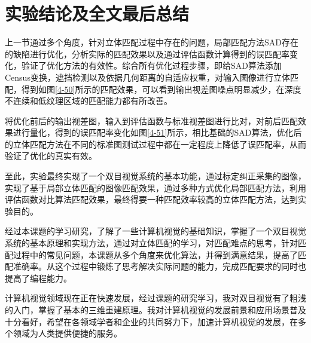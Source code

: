 \section{实验结论及全文最后总结}

上一节通过多个角度，针对立体匹配过程中存在的问题，局部匹配方法SAD存在的缺陷进行优化，分析实际的匹配效果以及通过评估函数计算得到的误匹配率变化，验证了优化方法的有效性。综合所有优化过程步骤，即给SAD算法添加Census变换，遮挡检测以及依据几何距离的自适应权重，对输入图像进行立体匹配，得到如图\ref{4-50}所示的匹配效果，可以看到输出视差图噪点明显减少，在深度不连续和低纹理区域的匹配能力都有所改善。


将优化前后的输出视差图，输入到评估函数与标准视差图进行比对，对前后匹配效果进行量化，得到的误匹配率变化如图\ref{4-51}所示，相比基础的SAD算法，优化后的立体匹配方法在不同的标准图测试过程中都在一定程度上降低了误匹配率，从而验证了优化的真实有效。

至此，实验最终实现了一个双目视觉系统的基本功能，通过标定纠正采集的图像，实现了基于局部立体匹配的图像匹配效果，通过多种方式优化局部匹配方法，利用评估函数对比算法匹配效果，最终得要一种匹配效率较高的立体匹配方法，达到实验目的。

经过本课题的学习研究，了解了一些计算机视觉的基础知识，掌握了一个双目视觉系统的基本原理和实现方法，通过对立体匹配的学习，对匹配难点的思考，针对匹配过程中的常见问题，本课题从多个角度来优化算法，并得到满意结果，提高了匹配准确率。从这个过程中锻炼了思考解决实际问题的能力，完成匹配要求的同时也提高了编程能力。

计算机视觉领域现在正在快速发展，经过课题的研究学习，我对双目视觉有了粗浅的入门，掌握了基本的三维重建原理。我对计算机视觉的发展前景和应用场景普及十分看好，希望在各领域学者和企业的共同努力下，加速计算机视觉的发展，在多个领域为人类提供便捷的服务。